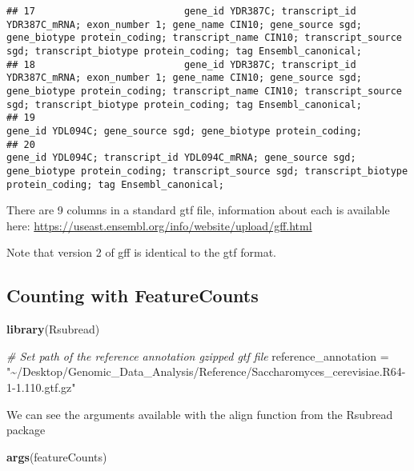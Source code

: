 \documentclass[
]{book}
\newenvironment{Shaded}{\begin{snugshade}}{\end{snugshade}}
\newcommand{\CommentTok}[1]{\textcolor[rgb]{0.56,0.35,0.01}{\textit{#1}}}
\newcommand{\FunctionTok}[1]{\textcolor[rgb]{0.13,0.29,0.53}{\textbf{#1}}}
\newcommand{\NormalTok}[1]{#1}
\newcommand{\OtherTok}[1]{\textcolor[rgb]{0.56,0.35,0.01}{#1}}
\newcommand{\StringTok}[1]{\textcolor[rgb]{0.31,0.60,0.02}{#1}}
\begin{document}
\begin{verbatim}
## 17                          gene_id YDR387C; transcript_id YDR387C_mRNA; exon_number 1; gene_name CIN10; gene_source sgd; gene_biotype protein_coding; transcript_name CIN10; transcript_source sgd; transcript_biotype protein_coding; tag Ensembl_canonical;
## 18                          gene_id YDR387C; transcript_id YDR387C_mRNA; exon_number 1; gene_name CIN10; gene_source sgd; gene_biotype protein_coding; transcript_name CIN10; transcript_source sgd; transcript_biotype protein_coding; tag Ensembl_canonical;
## 19                                                                                                                                                                                              gene_id YDL094C; gene_source sgd; gene_biotype protein_coding;
## 20                                                                                 gene_id YDL094C; transcript_id YDL094C_mRNA; gene_source sgd; gene_biotype protein_coding; transcript_source sgd; transcript_biotype protein_coding; tag Ensembl_canonical;
\end{verbatim}

There are 9 columns in a standard gtf file, information about each is available here: \url{https://useast.ensembl.org/info/website/upload/gff.html}

Note that version 2 of gff is identical to the gtf format.

\hypertarget{counting-with-featurecounts}{%
\subsection{Counting with FeatureCounts}\label{counting-with-featurecounts}}

\begin{Shaded}
\begin{Highlighting}[]
\FunctionTok{library}\NormalTok{(Rsubread)}

\CommentTok{\# Set path of the reference annotation gzipped gtf file}
\NormalTok{reference\_annotation }\OtherTok{=} \StringTok{"\textasciitilde{}/Desktop/Genomic\_Data\_Analysis/Reference/Saccharomyces\_cerevisiae.R64{-}1{-}1.110.gtf.gz"}
\end{Highlighting}
\end{Shaded}

We can see the arguments available with the align function from the Rsubread package

\begin{Shaded}
\begin{Highlighting}[]
\FunctionTok{args}\NormalTok{(featureCounts)}
\end{Highlighting}
\end{Shaded}
\end{document}
